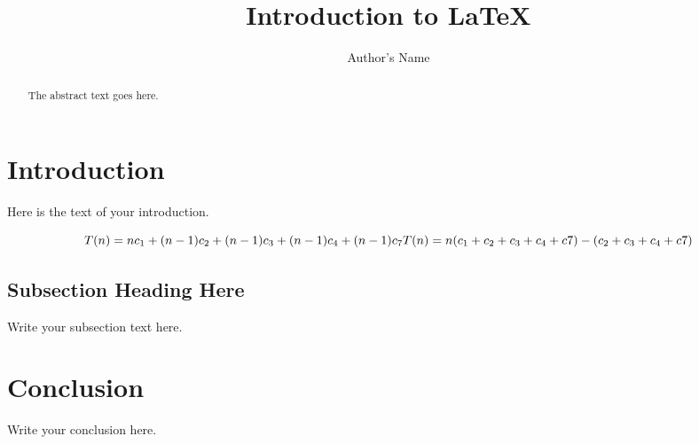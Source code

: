 \documentclass{article}
\begin{document}
\title{Introduction to \LaTeX{}}
\author{Author's Name}

\maketitle

\begin{abstract}
The abstract text goes here.
\end{abstract}

\section{Introduction}
Here is the text of your introduction.

\begin{equation}
  T(n) = nc_1 + (n - 1)c_2 + (n - 1)c_3 + (n-1)c_4 + (n-1)c_7\\
  T(n) = n(c_1 + c_2 + c_3 + c_4 + c7) - (c_2 + c_3 + c_4 + c7)
\end{equation}

\subsection{Subsection Heading Here}
Write your subsection text here.



\section{Conclusion}
Write your conclusion here.
\end{document}
